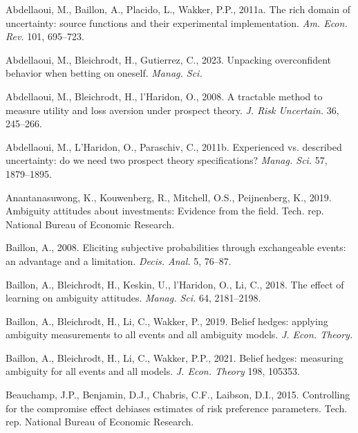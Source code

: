 \documentclass[12pt,a4paper]{article}
\newenvironment{original}
  {\par\vspace{0.5em}\noindent\color{black}\ignorespaces}
  {\par\vspace{0.3em}}
\begin{document}
\begin{original}
\noindent Abdellaoui, M., Baillon, A., Placido, L., Wakker, P.P., 2011a. The rich domain of uncertainty: source functions and their experimental implementation. \textit{Am. Econ. Rev.} 101, 695--723.

\vspace{0.3em}
\noindent Abdellaoui, M., Bleichrodt, H., Gutierrez, C., 2023. Unpacking overconfident behavior when betting on oneself. \textit{Manag. Sci.}

\vspace{0.3em}
\noindent Abdellaoui, M., Bleichrodt, H., l'Haridon, O., 2008. A tractable method to measure utility and loss aversion under prospect theory. \textit{J. Risk Uncertain.} 36, 245--266.

\vspace{0.3em}
\noindent Abdellaoui, M., L'Haridon, O., Paraschiv, C., 2011b. Experienced vs. described uncertainty: do we need two prospect theory specifications? \textit{Manag. Sci.} 57, 1879--1895.

\vspace{0.3em}
\noindent Anantanasuwong, K., Kouwenberg, R., Mitchell, O.S., Peijnenberg, K., 2019. Ambiguity attitudes about investments: Evidence from the field. Tech. rep. National Bureau of Economic Research.

\vspace{0.3em}
\noindent Baillon, A., 2008. Eliciting subjective probabilities through exchangeable events: an advantage and a limitation. \textit{Decis. Anal.} 5, 76--87.

\vspace{0.3em}
\noindent Baillon, A., Bleichrodt, H., Keskin, U., l'Haridon, O., Li, C., 2018. The effect of learning on ambiguity attitudes. \textit{Manag. Sci.} 64, 2181--2198.

\vspace{0.3em}
\noindent Baillon, A., Bleichrodt, H., Li, C., Wakker, P., 2019. Belief hedges: applying ambiguity measurements to all events and all ambiguity models. \textit{J. Econ. Theory.}

\vspace{0.3em}
\noindent Baillon, A., Bleichrodt, H., Li, C., Wakker, P.P., 2021. Belief hedges: measuring ambiguity for all events and all models. \textit{J. Econ. Theory} 198, 105353.

\vspace{0.3em}
\noindent Beauchamp, J.P., Benjamin, D.J., Chabris, C.F., Laibson, D.I., 2015. Controlling for the compromise effect debiases estimates of risk preference parameters. Tech. rep. National Bureau of Economic Research.


\end{original}
\end{document}
